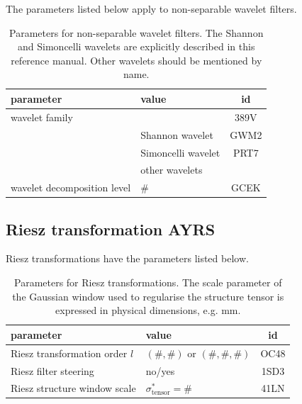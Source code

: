 \documentclass[fleqn,a4paper,oneside,openany]{book}
\newcommand\id[1]{{\hfill\normalsize{\idfont #1}}}
\newcommand\textid[1]{{\normalsize{\idfont #1}}}
\begin{document}
The parameters listed below apply to non-separable wavelet filters.

\begin{table}[ht]
\centering
\small
\begin{tabular}{llc}
\toprule
\textbf{parameter} & \textbf{value} & \textbf{id}\\
\midrule
wavelet family & & \textid{389V}\\
& Shannon wavelet & \textid{GWM2}\\
& Simoncelli wavelet & \textid{PRT7}\\
& other wavelets & \\
wavelet decomposition level & \# & \textid{GCEK}\\
\bottomrule
\end{tabular}
\caption{Parameters for non-separable wavelet filters. The Shannon and Simoncelli wavelets are explicitly described in this reference manual. Other wavelets should be mentioned by name.}
\end{table}

\FloatBarrier

\subsection[Riesz transformation]{Riesz transformation \id{AYRS}}

Riesz transformations have the parameters listed below.

\begin{table}[ht]
\centering
\small
\begin{tabular}{llc}
\toprule
\textbf{parameter} & \textbf{value} & \textbf{id}\\
\midrule
Riesz transformation order \(l\) & \((\#, \#)\) or \((\#, \#, \#)\) & \textid{OC48}\\
Riesz filter steering & no/yes & \textid{1SD3}\\
Riesz structure window scale & \(\sigma^*_{\text{tensor}}=\#\) & \textid{41LN}\\
\bottomrule
\end{tabular}
\caption{Parameters for Riesz transformations. The scale parameter of the Gaussian window used to regularise the structure tensor is expressed in physical dimensions, e.g. mm.}
\end{table}

%
\end{document}
